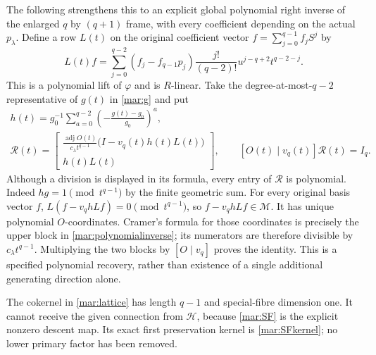 \documentclass[11pt]{article}
\begin{document}
The following strengthens this to an explicit global polynomial
right inverse of the enlarged $q$ by $(q+1)$ frame, with every
coefficient depending on the actual $p_\lambda$. Define a row
$L(t)$ on the original coefficient vector $f=\sum_{j=0}^{q-1}f_jS^j$ by
\begin{equation}\tag{MAR15}\label{mar:liftrow}
 L(t)f=\sum_{j=0}^{q-2}(f_j-f_{q-1}p_j)
              \frac{j!}{(q-2)!}u^{j-q+2}t^{q-2-j}.
\end{equation}
This is a polynomial lift of $\varphi$ and is $R$-linear.
Take the degree-at-most-$q-2$ representative of $g(t)$ in
\eqref{mar:g} and put
\begin{equation}\tag{MAR16}\label{mar:polynomialinverse}
 \begin{gathered}
 h(t)=g_0^{-1}\sum_{a=0}^{q-2}
               \left(-\frac{g(t)-g_0}{g_0}\right)^a,\\
 \mathcal R(t)=
 \begin{bmatrix}
 \displaystyle\frac{\operatorname{adj}O(t)}{c_\lambda t^{q-1}}
                   \bigl(I-v_q(t)h(t)L(t)\bigr)\\[3pt]
 h(t)L(t)
 \end{bmatrix},\qquad
 [O(t)\mid v_q(t)]\mathcal R(t)=I_q.
 \end{gathered}
\end{equation}
Although a division is displayed in its formula, every entry of
$\mathcal R$ is polynomial. Indeed $h g=1\pmod{t^{q-1}}$ by
the finite geometric sum. For every original basis vector $f$,
$L(f-v_qhLf)=0\pmod{t^{q-1}}$, so $f-v_qhLf\in\mathscr M$.
It has unique polynomial $O$-coordinates. Cramer's formula for those
coordinates is precisely the upper block in \eqref{mar:polynomialinverse};
its numerators are therefore divisible by $c_\lambda t^{q-1}$.
Multiplying the two blocks by $[O\mid v_q]$ proves the identity.
This is a specified polynomial recovery, rather than existence of a
single additional generating direction alone.

The cokernel in \eqref{mar:lattice} has length $q-1$ and special-fibre
dimension one. It cannot receive the given connection from
$\mathscr H$, because \eqref{mar:SF} is the explicit nonzero descent
map. Its exact first preservation kernel is
\eqref{mar:SFkernel}; no lower primary factor has been removed.
\end{document}

